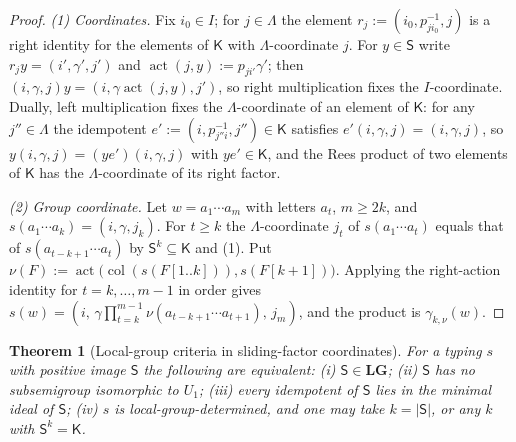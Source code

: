 \documentclass[11pt]{article}
\numberwithin{equation}{section}
\theoremstyle{plain}
\newtheorem{theorem}{Theorem}[section]
\theoremstyle{definition}
\theoremstyle{remark}
\theoremstyle{plain}
\begin{document}
\begin{proof}
\emph{(1) Coordinates.}  Fix $i_0\in I$; for $j\in\Lambda$ the element
$r_j:=(i_0,p_{ji_0}^{-1},j)$ is a right identity for the elements of $\mathsf K$ with
$\Lambda$-coordinate $j$.  For $y\in \mathsf S$ write $r_jy=(i',\gamma',j')$ and
$\operatorname{act}(j,y):=p_{ji'}\gamma'$; then
$(i,\gamma,j)y=(i,\gamma\operatorname{act}(j,y),j')$, so right multiplication fixes the
$I$-coordinate.  Dually, left multiplication fixes the $\Lambda$-coordinate of an
element of $\mathsf K$: for any $j''\in\Lambda$ the idempotent
$e':=(i,p_{j''i}^{-1},j'')\in\mathsf K$ satisfies $e'(i,\gamma,j)=(i,\gamma,j)$, so
$y(i,\gamma,j)=(ye')(i,\gamma,j)$ with $ye'\in\mathsf K$, and the Rees product of two
elements of $\mathsf K$ has the $\Lambda$-coordinate of its right factor.

\emph{(2) Group coordinate.}  Let $w=a_1\cdots a_m$ with letters $a_t$, $m\ge2k$, and
$s(a_1\cdots a_k)=(i,\gamma,j_k)$.  For $t\ge k$ the $\Lambda$-coordinate $j_t$
of $s(a_1\cdots a_t)$ equals that of $s(a_{t-k+1}\cdots a_t)$ by $\mathsf S^k\subseteq\mathsf K$
and (1).  Put
$\nu(F):=\operatorname{act}\bigl(\operatorname{col}(s(F[1..k])),s(F[k+1])\bigr)$.  Applying the
right-action identity for $t=k,\ldots,m-1$ in order gives
$s(w)=(i,\,\gamma\prod_{t=k}^{m-1}\nu(a_{t-k+1}\cdots a_{t+1}),\,j_m)$, and the
product is $\gamma_{k,\nu}(w)$.
\end{proof}

\begin{theorem}[Local-group criteria in sliding-factor coordinates]
\label{thm:lg-characterization}
For a typing $s$ with positive image $\mathsf S$ the following are equivalent:
\textup{(i)} $\mathsf S\in\mathbf{LG}$; \textup{(ii)} $\mathsf S$ has no subsemigroup isomorphic to
$U_1$; \textup{(iii)} every idempotent of $\mathsf S$ lies in the minimal ideal of $\mathsf S$;
\textup{(iv)} $s$ is local-group-determined, and one may take $k=|\mathsf S|$, or any $k$ with $\mathsf S^k=\mathsf K$.
\end{theorem}
\end{document}
